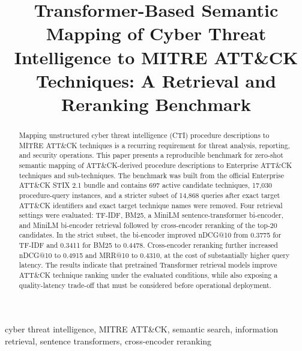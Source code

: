 \documentclass[conference]{IEEEtran}
\begin{document}
\title{Transformer-Based Semantic Mapping of Cyber Threat Intelligence to MITRE ATT\&CK Techniques: A Retrieval and Reranking Benchmark}

\author{
}

\maketitle

\begin{abstract}
Mapping unstructured cyber threat intelligence (CTI) procedure descriptions to MITRE ATT\&CK techniques is a recurring requirement for threat analysis, reporting, and security operations. This paper presents a reproducible benchmark for zero-shot semantic mapping of ATT\&CK-derived procedure descriptions to Enterprise ATT\&CK techniques and sub-techniques. The benchmark was built from the official Enterprise ATT\&CK STIX 2.1 bundle and contains 697 active candidate techniques, 17,030 procedure-query instances, and a stricter subset of 14,868 queries after exact target ATT\&CK identifiers and exact target technique names were removed. Four retrieval settings were evaluated: TF-IDF, BM25, a MiniLM sentence-transformer bi-encoder, and MiniLM bi-encoder retrieval followed by cross-encoder reranking of the top-20 candidates. In the strict subset, the bi-encoder improved nDCG@10 from 0.3775 for TF-IDF and 0.3411 for BM25 to 0.4478. Cross-encoder reranking further increased nDCG@10 to 0.4915 and MRR@10 to 0.4310, at the cost of substantially higher query latency. The results indicate that pretrained Transformer retrieval models improve ATT\&CK technique ranking under the evaluated conditions, while also exposing a quality-latency trade-off that must be considered before operational deployment.
\end{abstract}

\begin{IEEEkeywords}
cyber threat intelligence, MITRE ATT\&CK, semantic search, information retrieval, sentence transformers, cross-encoder reranking
\end{IEEEkeywords}
\end{document}
